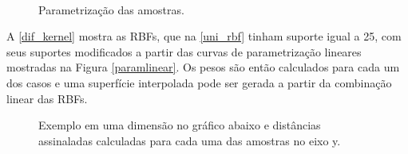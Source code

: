 \begin{figure}[H] 
    \centering
    \caption{Parametrização das amostras.} \label{param}
      \\
\end{figure}

A \autoref{dif_kernel} mostra as RBFs, que na \autoref{uni_rbf} tinham suporte igual a 25, com seus suportes modificados a partir das curvas de parametrização lineares mostradas na Figura \autoref{paramlinear}. Os pesos são então calculados para cada um dos casos e uma superfície interpolada pode ser gerada a partir da combinação linear das RBFs.

\begin{figure}[H] 
    \centering
    \caption{Exemplo em uma dimensão no gráfico abaixo e distâncias assinaladas calculadas para cada uma das amostras no eixo y.} \label{dif_kernel}
     \hspace{1em}
\end{figure}

